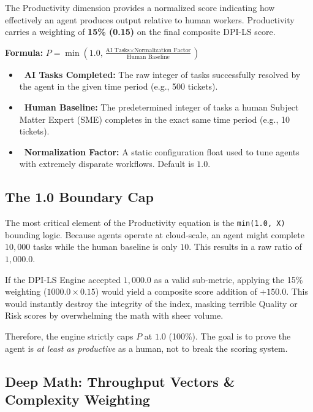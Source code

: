 \documentclass[11pt,a4paper]{article}
\begin{document}
The Productivity dimension provides a normalized score indicating how effectively an agent produces output relative to human workers. Productivity carries a weighting of \textbf{15\% (0.15)} on the final composite DPI-LS score.

\begin{dpiimportant}
\textbf{Formula:} $P = \min\left(1.0, \frac{\text{AI Tasks} \times \text{Normalization Factor}}{\text{Human Baseline}}\right)$
\end{dpiimportant}

\begin{itemize}
    \item \textbf{\color{dpiblue}\faRobot\ AI Tasks Completed:} The raw integer of tasks successfully resolved by the agent in the given time period (e.g., 500 tickets).
    \item \textbf{\color{dpiteal}\faUserTie\ Human Baseline:} The predetermined integer of tasks a human Subject Matter Expert (SME) completes in the exact same time period (e.g., 10 tickets).
    \item \textbf{\color{dpigreen}\faBalanceScale\ Normalization Factor:} A static configuration float used to tune agents with extremely disparate workflows. Default is $1.0$.
\end{itemize}

\subsection{The 1.0 Boundary Cap}

The most critical element of the Productivity equation is the \texttt{min(1.0, X)} bounding logic. Because agents operate at cloud-scale, an agent might complete $10,000$ tasks while the human baseline is only $10$. This results in a raw ratio of $1,000.0$.

If the DPI-LS Engine accepted $1,000.0$ as a valid sub-metric, applying the 15\% weighting ($1000.0 \times 0.15$) would yield a composite score addition of $+150.0$. This would instantly destroy the integrity of the index, masking terrible Quality or Risk scores by overwhelming the math with sheer volume.

Therefore, the engine strictly caps $P$ at $1.0$ (100\%). The goal is to prove the agent is \textit{at least as productive} as a human, not to break the scoring system.

\subsection{Deep Math: Throughput Vectors \& Complexity Weighting}
\end{document}
